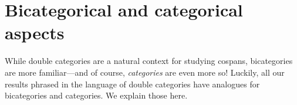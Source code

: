 \documentclass[a4paper,onecolumn, superscriptaddress,10pt, accepted=2022-03-25, issue=SS, volume=VV, shorttitle=papers/compositionality-VV-SS]{compositionalityarticle}
\let\maps\colon
\newcommand{\A}{\mathsf{A}}
\newcommand{\C}{\mathsf{C}}
\newcommand{\D}{\mathsf{D}}
\newcommand{\bicat}{\mathbf}
\newcommand{\Rex}{\bicat{Rex}}
\newcommand{\SMC}{\bicat{SymMonCat}}
\begin{document}
\iffalse
Presheaf categories provide many examples of \cref{thm:equiv}.  Suppose $\phi \maps \C \to \D$ is any functor between small categories.  Then precomposition with $\phi$ gives a functor $\phi^\ast \maps \widehat{\D} \to \widehat{\C}$ between their presheaf categories, and this has a left adjoint $\phi_! \maps \widehat{\C} \to \widehat{\D}$.   
\fi

\iffalse
In fact, a careful examination of the proof reveals that the assumptions of \cref{thm:equiv} could be weakened to state that the pseudofunctor $F \maps \A \to \SMC$ factors through the 2-category $\mathbf{Cocart}$ of cocartesian monoidal categories.   The reason is that when we compose two structured cospans as in \cref{eq:pushoutissum}, the apex of the composite cospan ends up being a sum in the second variable due to the definition of the left adjoint functor $L$ which forces the feet of all cospans to involve a fiberwise initial object.  However, in the most interesting examples seen so far, when $F$ factors through $\mathbf{Cocart}$ it also factors through $\Rex$.   
\fi

\section{Bicategorical and categorical aspects}
\label{spinoffs}

While double categories are a natural context for studying cospans, bicategories are more 
familiar---and of course, \emph{categories} are even more so!   Luckily, all our results 
phrased in the language of double categories have analogues for bicategories and categories.  
We explain those here.
\end{document}
